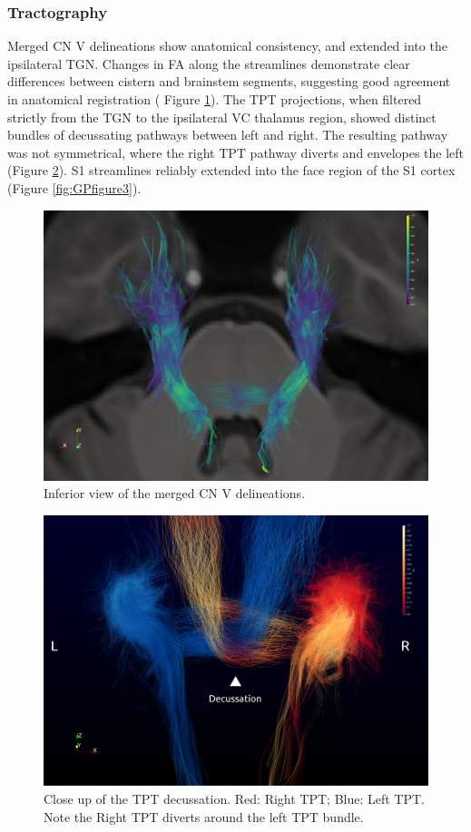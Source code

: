 \subsubsection{Tractography}
Merged CN V delineations show anatomical consistency, and extended into the ipsilateral TGN. Changes in FA along the streamlines demonstrate clear differences between cistern and brainstem segments, suggesting good agreement in anatomical registration ( Figure \ref{fig:GPfigure1}). 
The TPT projections, when filtered strictly from the TGN to the ipsilateral VC thalamus region, showed distinct bundles of decussating pathways between left and right. The resulting pathway was not symmetrical, where the right TPT pathway diverts and envelopes the left (Figure \ref{fig:GPfigure2}).
S1 streamlines reliably extended into the face region of the S1 cortex (Figure \ref{fig:GPfigure3}). 

\begin{figure}[ht]
\centering
\includegraphics[width=\linewidth]{cnv-inferior-view.png}
\caption{Inferior view of the merged CN V delineations.}
\label{fig:GPfigure1}
\end{figure}

\begin{figure}[ht]
\centering
\includegraphics[width=\linewidth]{view-decussation.png}
\caption{Close up of the TPT decussation. Red: Right TPT; Blue: Left TPT. Note the Right TPT diverts around the left TPT bundle. }
\label{fig:GPfigure2}
\end{figure}

